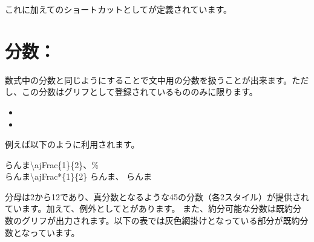 \documentclass[uplatex, dvipdfmx, paper=a4paper, line_length=45zw, head_space=7zw, foot_space=10zw]{jlreq}
\begin{document}
これに加えてのショートカットとしてが定義されています。

\newpage
\section{分数：\texorpdfstring{}{\textbackslash ajFrac}}

数式中の分数と同じようにすることで文中用の分数を扱うことが出来ます。ただし、この分数はグリフとして登録されているもののみに限ります。

\begin{itemize}
  \item {}
  \item {}
\end{itemize}

例えば以下のように利用されます。

\begin{demosource}
  らんま{\textbackslash}ajFrac\{1\}\{2\}、\% \\
  らんま{\textbackslash}ajFrac*\{1\}\{2\}
  \tcblower
  らんま{\ibmfamily{}}、%
  らんま{\ibmfamily{}}
\end{demosource}

分母は2から12であり、真分数となるような45の分数（各2スタイル）が提供されています。加えて、例外として{}と{}があります。
また、約分可能な分数は既約分数のグリフが出力されます。以下の表では灰色網掛けとなっている部分が既約分数となっています。
\end{document}
